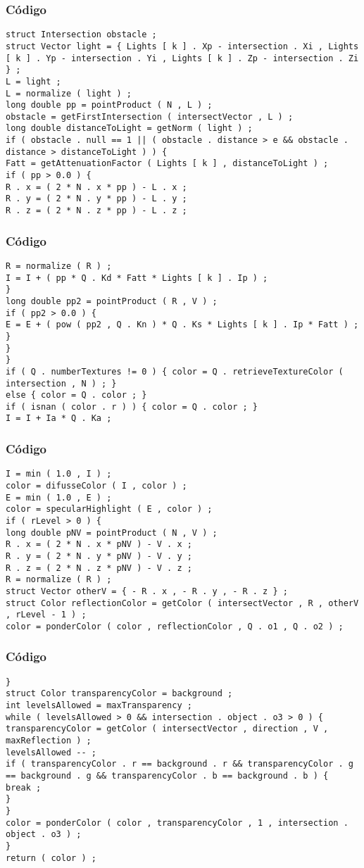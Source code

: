 \documentclass{beamer}
\begin{document}
\begin{frame}[fragile]
\frametitle{C\'odigo}
\begin{verbatim}
struct Intersection obstacle ; 
struct Vector light = { Lights [ k ] . Xp - intersection . Xi , Lights [ k ] . Yp - intersection . Yi , Lights [ k ] . Zp - intersection . Zi } ; 
L = light ; 
L = normalize ( light ) ; 
long double pp = pointProduct ( N , L ) ; 
obstacle = getFirstIntersection ( intersectVector , L ) ; 
long double distanceToLight = getNorm ( light ) ; 
if ( obstacle . null == 1 || ( obstacle . distance > e && obstacle . distance > distanceToLight ) ) { 
Fatt = getAttenuationFactor ( Lights [ k ] , distanceToLight ) ; 
if ( pp > 0.0 ) { 
R . x = ( 2 * N . x * pp ) - L . x ; 
R . y = ( 2 * N . y * pp ) - L . y ; 
R . z = ( 2 * N . z * pp ) - L . z ; 
\end{verbatim}
\end{frame}
\begin{frame}[fragile]
\frametitle{C\'odigo}
\begin{verbatim}
R = normalize ( R ) ; 
I = I + ( pp * Q . Kd * Fatt * Lights [ k ] . Ip ) ; 
} 
long double pp2 = pointProduct ( R , V ) ; 
if ( pp2 > 0.0 ) { 
E = E + ( pow ( pp2 , Q . Kn ) * Q . Ks * Lights [ k ] . Ip * Fatt ) ; 
} 
} 
} 
if ( Q . numberTextures != 0 ) { color = Q . retrieveTextureColor ( intersection , N ) ; } 
else { color = Q . color ; } 
if ( isnan ( color . r ) ) { color = Q . color ; } 
I = I + Ia * Q . Ka ; 
\end{verbatim}
\end{frame}
\begin{frame}[fragile]
\frametitle{C\'odigo}
\begin{verbatim}
I = min ( 1.0 , I ) ; 
color = difusseColor ( I , color ) ; 
E = min ( 1.0 , E ) ; 
color = specularHighlight ( E , color ) ; 
if ( rLevel > 0 ) { 
long double pNV = pointProduct ( N , V ) ; 
R . x = ( 2 * N . x * pNV ) - V . x ; 
R . y = ( 2 * N . y * pNV ) - V . y ; 
R . z = ( 2 * N . z * pNV ) - V . z ; 
R = normalize ( R ) ; 
struct Vector otherV = { - R . x , - R . y , - R . z } ; 
struct Color reflectionColor = getColor ( intersectVector , R , otherV , rLevel - 1 ) ; 
color = ponderColor ( color , reflectionColor , Q . o1 , Q . o2 ) ; 
\end{verbatim}
\end{frame}
\begin{frame}[fragile]
\frametitle{C\'odigo}
\begin{verbatim}
} 
struct Color transparencyColor = background ; 
int levelsAllowed = maxTransparency ; 
while ( levelsAllowed > 0 && intersection . object . o3 > 0 ) { 
transparencyColor = getColor ( intersectVector , direction , V , maxReflection ) ; 
levelsAllowed -- ; 
if ( transparencyColor . r == background . r && transparencyColor . g == background . g && transparencyColor . b == background . b ) { 
break ; 
} 
} 
color = ponderColor ( color , transparencyColor , 1 , intersection . object . o3 ) ; 
} 
return ( color ) ; 
\end{verbatim}
\end{frame}
\end{document}
